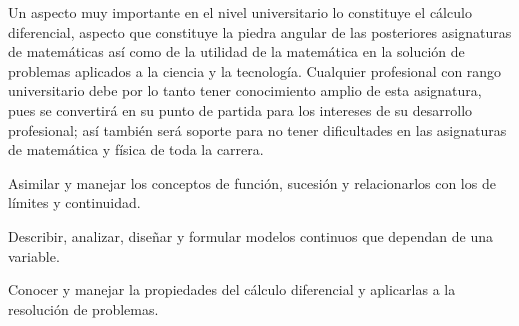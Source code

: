 \begin{syllabus}


\begin{justification}
Un aspecto muy importante en el nivel universitario lo constituye el cálculo diferencial,  aspecto que constituye la piedra angular de las posteriores asignaturas de matemáticas así como de la utilidad de la matemática en la solución de problemas aplicados a la ciencia y la tecnología. Cualquier profesional con rango universitario debe por lo tanto tener conocimiento amplio de esta asignatura, pues se convertirá en su punto de partida para los intereses de su desarrollo profesional; así también será soporte para no tener dificultades en las asignaturas de matemática y física de toda la carrera.
\end{justification}

\begin{goals}
\item Asimilar y manejar los conceptos de función, sucesión y relacionarlos con los de límites y continuidad.
\item Describir, analizar, diseñar y formular modelos continuos que dependan de una variable.
\item Conocer y manejar la propiedades del cálculo diferencial y aplicarlas a la resolución de problemas.
\end{goals}

\begin{outcomes}
    \item {}
    \item {}
\end{outcomes}

\begin{competences}
    \item {}
    \item {}
    \item {}
\end{competences}


\end{syllabus}
